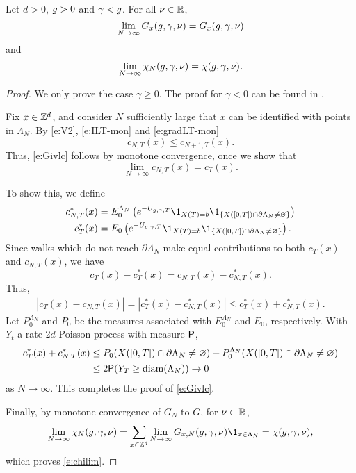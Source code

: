 \begin{prop}
\label{prop:finvol-re}
Let $d >0$, $g >0$ and $\gamma < g$. For all $\nu \in {\mathbb R}$,
\begin{equation}
\label{e:Givlc}
\lim_{N \rightarrow \infty}
G_x(g,\gamma,\nu)
=
G_x(g,\gamma,\nu)
\end{equation}
and
\begin{equation}
\label{e:chilim}
\lim_{N\rightarrow\infty}\chi_N(g,\gamma,\nu)=   \chi(g,\gamma,\nu).
\end{equation}
\end{prop}

\begin{proof}
We only prove the case $\gamma \ge 0$. The proof for $\gamma < 0$ can be found in
\cite{BSW-saw-sa}.

Fix $x \in { {{\mathbb Z}}^d }$, and consider $N$ sufficiently large that $x$ can be identified
with points in $\Lambda_N$.
By \eqref{e:V2}, \eqref{e:ILT-mon} and \eqref{e:gradLT-mon}
\begin{equation}
\label{e:ctmon}
c_{N,T}(x) \leq c_{N+1,T}(x).
\end{equation}
Thus, \eqref{e:Givlc} follows by monotone convergence, once we show that
\begin{equation}
\lim_{N\to\infty} c_{N,T}(x) = c_T(x).
\end{equation}

To show this, we define
\begin{align}
c_{N,T}^*(x)
  &=
E^{\Lambda_N}_0
\left(
  e^{-U_{\gcc,\gamma,T}} \1_{X(T)=b} \1_{\{X([0, T]) \cap \partial \Lambda_N \neq \varnothing\}}
\right) \\
c_T^*(x)
  &=
E_0
\left(
  e^{-U_{\gcc,\gamma,T}} \1_{X(T)=b} \1_{\{X([0, T]) \cap \partial \Lambda_N \neq \varnothing\}}
\right).
\end{align}
Since walks which do not reach $\partial \Lambda_N$ make equal contributions to both
$c_T(x)$ and $c_{N,T}(x)$,
we have
\begin{equation}
c_T(x) - c_T^*(x) = c_{N,T}(x) - c_{N,T}^*(x).
\end{equation}
Thus,
\begin{align}
|c_T(x) - c_{N,T}(x)|
= |c_T^*(x) - c_{N,T}^*(x)|
\leq c_T^*(x) + c_{N,T}^*(x).
\end{align}
Let $P^{\Lambda_N}_0$ and $P_0$ be the measures
associated with $E^{\Lambda_N}_0$ and $E_0$, respectively.
With $Y_t$ a rate-$2d$ Poisson process with measure ${\sf P}$,
\begin{align}
 c_T^*(x) + c_{N,T}^*(x)
  &\leq P_0 (X([0, T]) \cap \partial\Lambda_N \neq \varnothing)
    + P^{\Lambda_N}_0 (X([0, T]) \cap \partial\Lambda_N \neq \varnothing) \nonumber \\
  &\leq 2 {\sf P} (Y_T \geq \textrm{diam}(\Lambda_N)) \rightarrow 0
\end{align}
as $N\to\infty$.
This completes the proof of \eqref{e:Givlc}.

Finally, by monotone convergence of $G_N$ to $G$,
for $\nu \in {\mathbb R}$,
\begin{equation}
\lim_{N\to\infty} \chi_N(g, \gamma, \nu)
    = \sum_{x\in\Zd} \lim_{N\to\infty} G_{x,N}(\gcc,\gamma,\nu) \1_{x\in\Lambda_N}
    = \chi(g, \gamma, \nu),
\end{equation}
which proves \eqref{e:chilim}.
\end{proof}